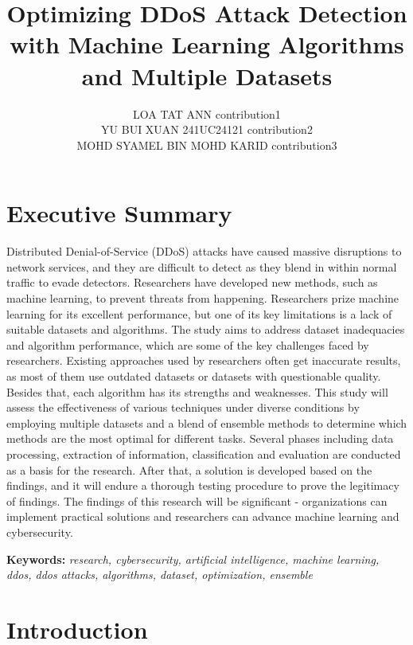 \documentclass[a4paper, 12pt]{article}
\author{
LOA TAT ANN \quad 1221304731 \quad contribution1 \\
YU BUI XUAN \quad 241UC24121 \quad contribution2\\
MOHD SYAMEL BIN MOHD KARID \quad 1221309130 \quad contribution3\\
}
\title{ Optimizing DDoS Attack Detection with Machine Learning Algorithms and Multiple Datasets }
\begin{document}
\maketitle


\section*{Executive Summary}

Distributed Denial-of-Service (DDoS) attacks have caused massive disruptions to network services, and they are difficult to detect as they blend in within normal traffic to evade detectors. Researchers have developed new methods, such as machine learning, to prevent threats from happening. Researchers prize machine learning for its excellent performance, but one of its key limitations is a lack of suitable datasets and algorithms. The study aims to address dataset inadequacies and algorithm performance, which are some of the key challenges faced by researchers. Existing approaches used by researchers often get inaccurate results, as most of them use outdated datasets or datasets with questionable quality. Besides that, each algorithm has its strengths and weaknesses. This study will assess the effectiveness of various techniques under diverse conditions by employing multiple datasets and a blend of ensemble methods to determine which methods are the most optimal for different tasks. Several phases including data processing, extraction of information, classification and evaluation are conducted as a basis for the research. After that, a solution is developed based on the findings, and it will endure a thorough testing procedure to prove the legitimacy of findings. The findings of this research will be significant - organizations can implement practical solutions and researchers can advance machine learning and cybersecurity.

\textbf{Keywords:} \textit{research, cybersecurity, artificial intelligence, machine learning, ddos, ddos attacks, algorithms, dataset, optimization, ensemble}

\section{Introduction}
\end{document}
